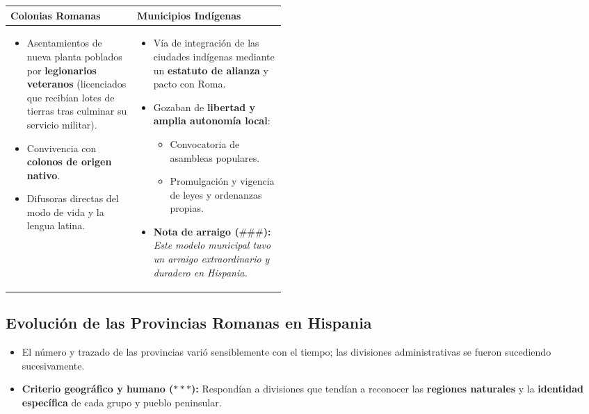 \documentclass[11pt,letterpaper]{article}
\begin{document}
\begin{tabularx}{\linewidth}{@{}p{0.46\linewidth} X@{}}
  \toprule
  \textbf{Colonias Romanas} & \textbf{Municipios Indígenas} \\
  \midrule
  \begin{itemize}[leftmargin=1.1em]
    \item Asentamientos de nueva planta poblados por \textbf{legionarios veteranos} (licenciados que recibían lotes de tierras tras culminar su servicio militar).
    \item Convivencia con \textbf{colonos de origen nativo}.
    \item Difusoras directas del modo de vida y la lengua latina.
  \end{itemize}
  &
  \begin{itemize}[leftmargin=1.1em]
    \item Vía de integración de las ciudades indígenas mediante un \textbf{estatuto de alianza} y pacto con Roma.
    \item Gozaban de \textbf{libertad y amplia autonomía local}:
    \begin{itemize}
      \item Convocatoria de asambleas populares.
      \item Promulgación y vigencia de leyes y ordenanzas propias.
    \end{itemize}
    \item \textbf{Nota de arraigo ($\#\#\#$):} \textit{Este modelo municipal tuvo un arraigo extraordinario y duradero en Hispania.}
  \end{itemize}
  \\ \bottomrule
\end{tabularx}

\subsection{Evolución de las Provincias Romanas en Hispania}
\begin{itemize}
  \item El número y trazado de las provincias varió sensiblemente con el tiempo; las divisiones administrativas se fueron sucediendo sucesivamente.
  \item \textbf{Criterio geográfico y humano ($***$):} Respondían a divisiones que tendían a reconocer las \textbf{regiones naturales} y la \textbf{identidad específica} de cada grupo y pueblo peninsular.
\end{itemize}
\end{document}
